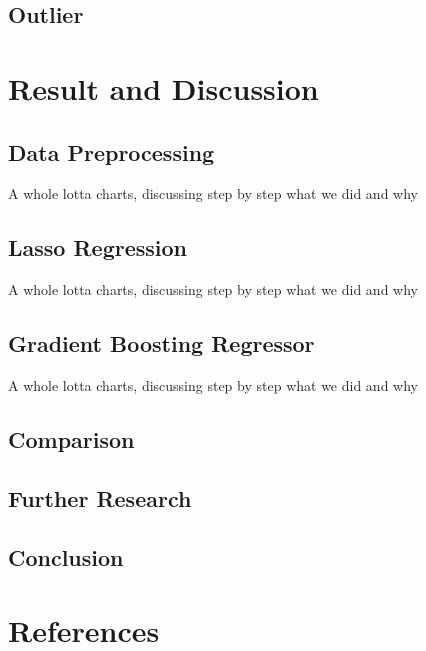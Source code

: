 \documentclass{article}
\begin{document}
\subsection{Outlier}
\section{Result and Discussion}
\subsection{Data Preprocessing}
A whole lotta charts, discussing step by step what we did and why
\subsection{Lasso Regression}
A whole lotta charts, discussing step by step what we did and why
\subsection{Gradient Boosting Regressor}
A whole lotta charts, discussing step by step what we did and why
\subsection{Comparison}
\subsection{Further Research}
\subsection{Conclusion}

\section{References}
\end{document}
